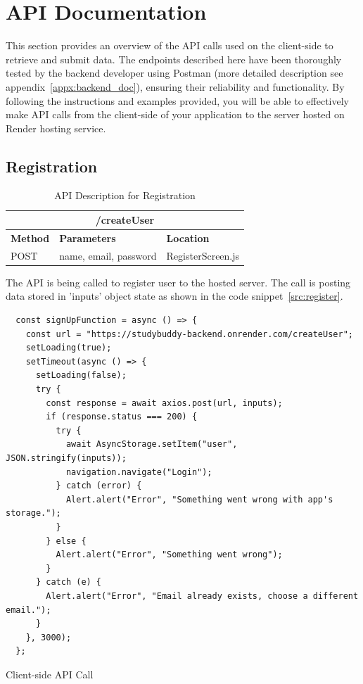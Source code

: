 \section{API Documentation}\label{sec:api}
This section provides an overview of the API calls used on the client-side to retrieve and submit data. The endpoints described here have been thoroughly tested by the backend developer using Postman (more detailed description see appendix~\ref{appx:backend_doc}), ensuring their reliability and functionality. By following the instructions and examples provided, you will be able to effectively make API calls from the client-side of your application to the server hosted on Render hosting service.
\subsection{Registration}
\begin{table}[H]
	\centering
	\begin{tabular}{ |p{}|p{}|p{}| }
		\hline
            \multicolumn{3}{|c|}{/createUser} \\
            \hline
		\textbf{Method} & \textbf{Parameters} & \textbf{Location}\\
            \hline
		  POST & name, email, password & RegisterScreen.js\\
            \hline
	\end{tabular}
	\caption{API Description for Registration}
	\label{tab:signup}
\end{table}
The API is being called to register user to the hosted server. The call is posting data stored in 'inputs' object state as shown in the code snippet~\ref{src:register}. 
\begin{listing}[H]
\begin{verbatim} 
  const signUpFunction = async () => {
    const url = "https://studybuddy-backend.onrender.com/createUser";
    setLoading(true);
    setTimeout(async () => {
      setLoading(false);
      try {
        const response = await axios.post(url, inputs);
        if (response.status === 200) {
          try {
            await AsyncStorage.setItem("user", JSON.stringify(inputs));
            navigation.navigate("Login");
          } catch (error) {
            Alert.alert("Error", "Something went wrong with app's storage.");
          }
        } else {
          Alert.alert("Error", "Something went wrong");
        }
      } catch (e) {
        Alert.alert("Error", "Email already exists, choose a different email.");
      }
    }, 3000);
  };
\end{verbatim}
\caption{Client-side API Call}
\label{src:register}
\end{listing}

